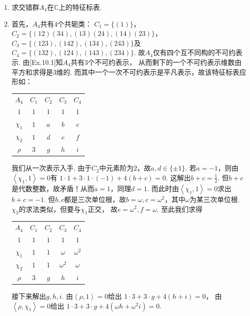 \begin{enumerate}
    \item[11.0] 求交错群$A_{4}$在$\mathbb{C}$上的特征标表.
        \item[\textbf{证明:}]
        首先，$A_{4}$共有$4$个共轭类：
        $C_{1}=\{(1)\}$，$C_{2}=\{(12)(34),(13)(24),(14)(23)\}$，
        $C_{3}=\{(123),(142),(134),(243)\}$及
        $C_{4}=\{(132),(124),(143),(234)\}$.
        故$A_{4}$仅有四个互不同构的不可约表示.
        由[Ex.10.1]知$A_{4}$共有$3$个不可约表示，
        从而剩下的一个不可约表示维数由平方和求得是$3$维的.
        而其中一个一次不可约表示是平凡表示，故该特征标表应形如： 
    \begin{table}\begin{tabular}{|c|c|c|c|c|}
        $A_{4}$ & $C_{1}$ & $C_{2}$ & $C_{3}$ & $C_{4}$ \\ 
        $1$ & $1$ & $1$ & $1$ & $1$  \\ 
        $\chi_{1}$ & $1$ & $a$ & $b$ & $c$  \\ 
        $\chi_{2}$ & $1$ & $d$ & $e$ & $f$  \\ 
        $\rho$ & $3$ & $g$ & $h$ & $i$
    \end{tabular}\end{table}
        我们从一次表示入手. 由于$C_{2}$中元素阶为$2$，故$a,d \in \{\pm 1\}$.
        若$a=-1$，则由$\left<\chi_{1},1\right>=0$有
        $1 \cdot 1 + 3 \cdot 1 \cdot (-1) + 4(b+c) = 0$. 这解出$b+c=\frac{1}{2}$.
        但$b+c$是代数整数，故矛盾！从而$a=1$，同理$d=1$.
        而此时由$\left<\chi_{1},1\right>=0$求出$b+c=-1$. 
        但$b,c$都是三次单位根，故$b=\omega,c=\omega^{2}$，其中$\omega$为某三次单位根.
        $\chi_{2}$的求法类似，但要与$\chi_{1}$正交，
        故$e=\omega^{2},f=\omega$. 至此我们求得
    \begin{center}
    \begin{tabular}{|c|c|c|c|c|}
        $A_{4}$ & $C_{1}$ & $C_{2}$ & $C_{3}$ & $C_{4}$ \\ 
        $1$ & $1$ & $1$ & $1$ & $1$  \\ 
        $\chi_{1}$ & $1$ & $1$ & $\omega$ & $\omega^{2}$  \\ 
        $\chi_{2}$ & $1$ & $1$ & $\omega^{2}$ & $\omega$  \\ 
        $\rho$ & $3$ & $g$ & $h$ & $i$
    \end{tabular}
    \end{center}
    接下来解出$g,h,i$. 由$\left<\rho,1\right>=0$给出
    $1 \cdot 3 + 3 \cdot g + 4(h + i) = 0$，
    由$\left<\rho,\chi_{1}\right>=0$给出
    $1 \cdot 3 + 3 \cdot g + 4(\omega h + \omega^{2}i) = 0$.

\end{enumerate}
